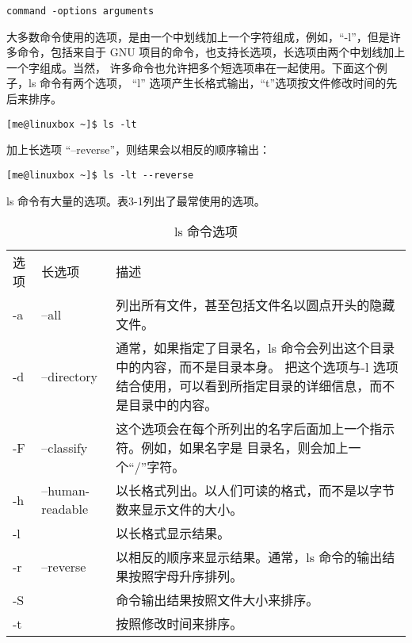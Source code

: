 \begin{lstlisting}
command -options arguments
\end{lstlisting}

\par 大多数命令使用的选项，是由一个中划线加上一个字符组成，例如，“-l”，但是许多命令，包括来自于 GNU 项目的命令，也支持长选项，长选项由两个中划线加上一个字组成。当然， 许多命令也允许把多个短选项串在一起使用。下面这个例子，ls 命令有两个选项， “l” 选项产生长格式输出，“t”选项按文件修改时间的先后来排序。

\begin{lstlisting}
[me@linuxbox ~]$ ls -lt
\end{lstlisting}

\par 加上长选项 “–reverse”，则结果会以相反的顺序输出：

\begin{lstlisting}
[me@linuxbox ~]$ ls -lt --reverse
\end{lstlisting}

\par ls 命令有大量的选项。表3-1列出了最常使用的选项。

\begin{table}[ht!]
\caption{ls 命令选项}
\label{table2}
\centering
\begin{tabular}{p{1.5cm}p{3.5cm}p{10cm}}
\rowcolor[gray]{0.8}
 选项 & 长选项 & 描述 \\

 -a & --all & 列出所有文件，甚至包括文件名以圆点开头的隐藏文件。 \\
-d & --directory & 通常，如果指定了目录名，ls 命令会列出这个目录中的内容，而不是目录本身。 把这个选项与-l 选项结合使用，可以看到所指定目录的详细信息，而不是目录中的内容。\\
-F & --classify	& 这个选项会在每个所列出的名字后面加上一个指示符。例如，如果名字是 目录名，则会加上一个``/''字符。 \\
-h & --human-readable & 以长格式列出。以人们可读的格式，而不是以字节数来显示文件的大小。\\
-l & & 以长格式显示结果。\\
-r & --reverse & 以相反的顺序来显示结果。通常，ls 命令的输出结果按照字母升序排列。 \\
-S & & 命令输出结果按照文件大小来排序。\\
-t & & 按照修改时间来排序。\\
\bottomrule
\end{tabular}
\end{table}


